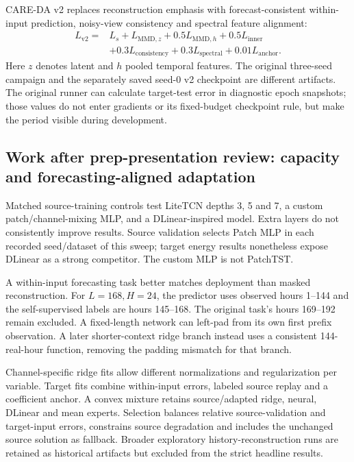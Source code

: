 CARE-DA v2 replaces reconstruction emphasis with forecast-consistent within-input prediction, noisy-view consistency and spectral feature alignment:
\begin{align}
L_{\mathrm{v2}}={}&L_s+L_{\mathrm{MMD},z}+0.5L_{\mathrm{MMD},h}+0.5L_{\mathrm{inner}}\nonumber\\
&+0.3L_{\mathrm{consistency}}+0.3L_{\mathrm{spectral}}+0.01L_{\mathrm{anchor}}.
\end{align}
Here $z$ denotes latent and $h$ pooled temporal features. The original three-seed campaign and the separately saved seed-0 v2 checkpoint are different artifacts. The original runner can calculate target-test error in diagnostic epoch snapshots; those values do not enter gradients or its fixed-budget checkpoint rule, but make the period visible during development.

\subsection{Work after prep-presentation review: capacity and forecasting-aligned adaptation}
Matched source-training controls test LiteTCN depths 3, 5 and 7, a custom patch/channel-mixing MLP, and a DLinear-inspired model. Extra layers do not consistently improve results. Source validation selects Patch MLP in each recorded seed/dataset of this sweep; target energy results nonetheless expose DLinear as a strong competitor. The custom MLP is not PatchTST.

A within-input forecasting task better matches deployment than masked reconstruction. For $L=168,H=24$, the predictor uses observed hours 1--144 and the self-supervised labels are hours 145--168. The original task's hours 169--192 remain excluded. A fixed-length network can left-pad from its own first prefix observation. A later shorter-context ridge branch instead uses a consistent 144-real-hour function, removing the padding mismatch for that branch.

Channel-specific ridge fits allow different normalizations and regularization per variable. Target fits combine within-input errors, labeled source replay and a coefficient anchor. A convex mixture retains source/adapted ridge, neural, DLinear and mean experts. Selection balances relative source-validation and target-input errors, constrains source degradation and includes the unchanged source solution as fallback. Broader exploratory history-reconstruction runs are retained as historical artifacts but excluded from the strict headline results.

